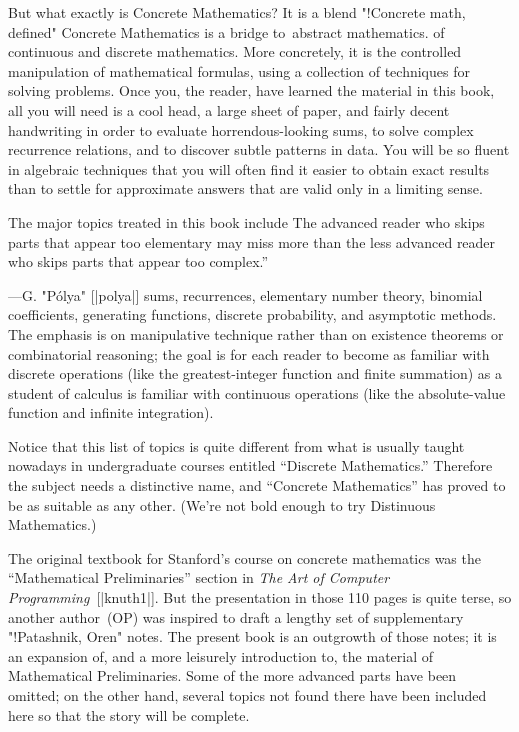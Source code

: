 But what exactly is Concrete Mathematics? It is a blend
"!Concrete math, defined"
\g Concrete Mathematics is a bridge to~abstract mathematics.\g
of {\sc con}tinuous and dis{\sc crete} mathematics. More
concretely, it is the controlled manipulation of mathematical
formulas, using a collection of techniques for solving problems.
Once you, the reader, have learned the material in this book,
all you will need is a cool head, a large sheet of paper, and
fairly decent handwriting in order to evaluate horrendous-looking
sums, to solve complex recurrence relations, and to discover
subtle patterns in data. You will be so fluent in algebraic techniques
that you will often find it easier to obtain exact results than to
settle for approximate answers that are valid only in a limiting sense.

The major topics treated in this book include
\g\noindent{}The advanced reader who skips parts that appear too elementary
may miss more than the less advanced reader who skips parts
that appear too complex.''\par\hfill\dash---G. "P\'olya" [|polya|]\g
 sums, recurrences,
elementary number theory, binomial coefficients,
generating functions, discrete probability, and asymptotic methods.
The emphasis is on manipulative technique rather than on existence
theorems or combinatorial reasoning;
the goal is for each reader to become as familiar with discrete operations
(like the greatest-integer function and finite summation) as a
student of calculus is familiar with continuous operations
(like the absolute-value function and infinite integration).

Notice that this list of topics is quite different from what is
usually taught nowadays in undergraduate courses entitled ``Discrete
Mathematics.\qback'' Therefore the subject needs a distinctive name,
and ``Concrete Mathematics'' has proved to be as suitable as any other.
\g (We're not bold enough to try Distinuous Mathematics.)\g

The original textbook for Stanford's course on concrete mathematics
was the ``Mathematical Preliminaries'' section in {\sl
The Art of Computer Programming\/}~[|knuth1|].
But the presentation in those 110 pages is quite terse, so another
author~(OP) was inspired to draft a lengthy set of supplementary
"!Patashnik, Oren"
notes. The present book is an outgrowth of those notes; it is
an expansion of,
and a more leisurely introduction to, the material of Mathematical
Preliminaries. Some of the more advanced
parts have been omitted; on the other hand, several
topics not found there have been included here so that the story
will be complete.

